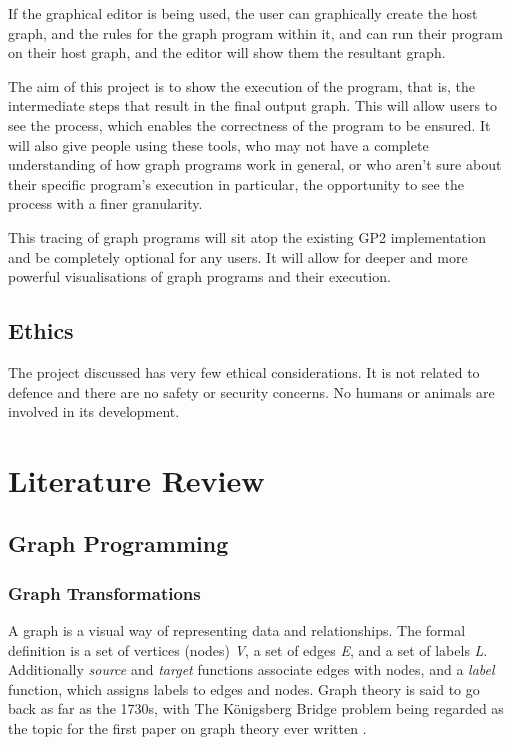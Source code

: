 \documentclass{UoYCSproject}
\begin{document}
If the graphical editor is being used, the user can graphically create the host graph, and the rules for the graph program within it, and can run their program on their host graph, and the editor will show them the resultant graph.

The aim of this project is to show the execution of the program, that is, the intermediate steps that result in the final output graph. This will allow users to see the process, which enables the correctness of the program to be ensured. It will also give people using these tools, who may not have a complete understanding of how graph programs work in general, or who aren't sure about their specific program's execution in particular, the opportunity to see the process with a finer granularity.

This tracing of graph programs will sit atop the existing GP2 implementation and be completely optional for any users. It will allow for deeper and more powerful visualisations of graph programs and their execution.
%

\section{Ethics}
The project discussed has very few ethical considerations. It is not related to defence and there are no safety or security concerns. No humans or animals are involved in its development.

\chapter{Literature Review}
\section{Graph Programming}

\subsection{Graph Transformations}
A graph is a visual way of representing data and relationships. The formal definition is a set of vertices (nodes) \emph{V}, a set of edges \emph{E}, and a set of labels \emph{L}. Additionally \emph{source} and \emph{target} functions associate edges with nodes, and a \emph{label} function, which assigns labels to edges and nodes.
Graph theory is said to go back as far as the 1730s, with The K{\"o}nigsberg Bridge problem being regarded as the topic for the first paper on graph theory ever written \cite{grathe_origin}. 
\end{document}
